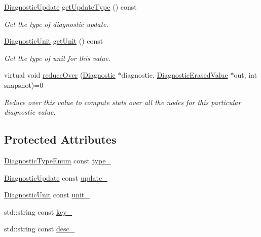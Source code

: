 \begin{DoxyCompactItemize}
\hyperlink{namespacevt_1_1runtime_1_1component_a896637e6e183a909a17bfd8d3943c206}{Diagnostic\+Update} \hyperlink{structvt_1_1runtime_1_1component_1_1detail_1_1_diagnostic_base_a8e43c10002b63cd3d3192103dcf44727}{get\+Update\+Type} () const
\begin{DoxyCompactList}\small\item\em Get the type of diagnostic update. \end{DoxyCompactList}\item 
\hyperlink{namespacevt_1_1runtime_1_1component_a99ec18b08862c712176126bb7d0e307a}{Diagnostic\+Unit} \hyperlink{structvt_1_1runtime_1_1component_1_1detail_1_1_diagnostic_base_aae529e6a682145fa59f90bcea0d5e6d8}{get\+Unit} () const
\begin{DoxyCompactList}\small\item\em Get the type of unit for this value. \end{DoxyCompactList}\item 
virtual void \hyperlink{structvt_1_1runtime_1_1component_1_1detail_1_1_diagnostic_base_a3a47051d20b9c7c66146eeda75fd7ad6}{reduce\+Over} (\hyperlink{structvt_1_1runtime_1_1component_1_1_diagnostic}{Diagnostic} $\ast$diagnostic, \hyperlink{structvt_1_1runtime_1_1component_1_1_diagnostic_erased_value}{Diagnostic\+Erased\+Value} $\ast$out, int snapshot)=0
\begin{DoxyCompactList}\small\item\em Reduce over this value to compute stats over all the nodes for this particular diagnostic value. \end{DoxyCompactList}\end{DoxyCompactItemize}
\subsection*{Protected Attributes}
\begin{DoxyCompactItemize}
\item 
\hyperlink{namespacevt_1_1runtime_1_1component_af0bb99d9a054682217874bdc735ecac0}{Diagnostic\+Type\+Enum} const \hyperlink{structvt_1_1runtime_1_1component_1_1detail_1_1_diagnostic_base_a3ec20887005eeff64bc9b5ff11b4660b}{type\+\_\+}
\item 
\hyperlink{namespacevt_1_1runtime_1_1component_a896637e6e183a909a17bfd8d3943c206}{Diagnostic\+Update} const \hyperlink{structvt_1_1runtime_1_1component_1_1detail_1_1_diagnostic_base_ad3cde52b9fbd10f4c5de29ce2d4878f3}{update\+\_\+}
\item 
\hyperlink{namespacevt_1_1runtime_1_1component_a99ec18b08862c712176126bb7d0e307a}{Diagnostic\+Unit} const \hyperlink{structvt_1_1runtime_1_1component_1_1detail_1_1_diagnostic_base_a2e77691cce01c69757483f4cdca65b19}{unit\+\_\+}
\item 
std\+::string const \hyperlink{structvt_1_1runtime_1_1component_1_1detail_1_1_diagnostic_base_a9933513cdc0b6cb0b05e453e31d8719a}{key\+\_\+}
\item 
std\+::string const \hyperlink{structvt_1_1runtime_1_1component_1_1detail_1_1_diagnostic_base_a1c70c4da286b442bf1dd0285f5c10fb3}{desc\+\_\+}
\end{DoxyCompactItemize}



